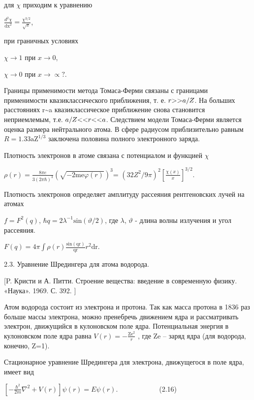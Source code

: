 \documentclass[a4paper,14pt, openany, twoside, draft]{extbook} %
\begin{document}
для ${\chi}$  приходим к уравнению

 $\frac{d^2\chi }{{\text{dx}}^2}=\frac{\chi ^{3/2}}{\sqrt x}$,

при граничных условиях

 $\chi \rightarrow 1$ при  $x\rightarrow 0$,

 $\chi \rightarrow 0$ при  $x\rightarrow \propto ?$.

Границы применимости метода Томаса-Ферми связаны с границами применимости квазиклассического приближения, т. е.  $r\text{{\textgreater}{\textgreater}}a/Z$. На больших расстояниях r\~{}a квазиклассическое приближение снова становится неприемлемым, т.е.  $a/Z\text{{\textless}{\textless}}r\text{{\textless}{\textless}}a$. Следствием модели Томаса-Ферми является оценка размера нейтрального атома. В сфере радиусом приблизительно равным  $R=1.33{\text{aZ}}^{1/3}$ заключена половина полного электронного заряда.

Плотность электронов в атоме связана с потенциалом и функцией  $\chi $

 $\rho (r)=\frac{8\mathit{\pi e}}{3(2\pi \hbar )^3}\left(\sqrt{-2{\text{me}}\varphi (r)}\right)^3$= $\left(32Z^2/9\pi \right)^2\left[\frac{\chi (x)} x\right]^{3/2}$.

Плотность электронов определяет амплитуду рассеяния рентгеновских лучей на атомах

 $f=F^2(q)$,  $\hbar q=2\lambda ^{-1}\text{sin}(\vartheta /2)$, где ${\lambda}$,  $\vartheta $ - длина волны излучения и угол рассеяния.

 $F(q)=4\pi \int \rho (r)\frac{\text{sin}({\text{qr}})}{{\text{qr}}}r^2{\text{dr}}$.\ \ \ \

2.3. Уравнение Шредингера для атома водорода.

 [P. Кристи и  А. Питти. Строение вещества: введение в современную физику. «Наука». 1969. С. 392. ]

Атом водорода состоит из электрона и протона. Так как масса протона в 1836 раз больше массы электрона, можно пренебречь движением ядра и рассматривать электрон, движущийся в кулоновском поле ядра. Потенциальная энергия в кулоновском поле ядра равна  $V(r)=-\frac{{\text{Ze}}^2} r$ , где Ze – заряд ядра (для водорода, конечно, Z=1).

Стационарное уравнение Шредингера для электрона, движущегося в поле ядра, имеет вид

 $\left[-\frac{\hbar ^2}{2m}\nabla ^2+V(r)\right]\psi (r)=\mathit{E\psi }(r)$.\ \ \ \ \ \ \ \ \ \ \ \ (2.16)
\end{document}
